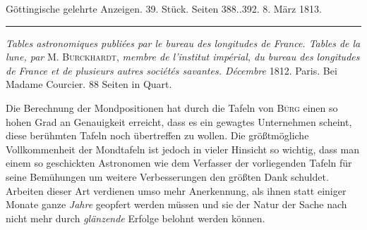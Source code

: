 \clearpage
{}
\begin{center}\small Göttingische gelehrte Anzeigen. 39. Stück. Seiten 388..392. 8. März 1813.\\[3pt]\rule{.72\linewidth}{.3pt}\end{center}

\emph{Tables astronomiques publiées par le bureau des longitudes de France. Tables de la lune, par} M. \textsc{Burckhardt}, \emph{membre de l'institut impérial, du bureau des longitudes de France et de plusieurs autres sociétés savantes. Décembre} 1812. Paris. Bei Madame Courcier. 88 Seiten in Quart.

Die Berechnung der Mondpositionen hat durch die Tafeln von \textsc{Bürg} einen so hohen Grad an Genauigkeit erreicht, dass es ein gewagtes Unternehmen scheint, diese berühmten Tafeln noch übertreffen zu wollen. Die größtmögliche Vollkommenheit der Mondtafeln ist jedoch in vieler Hinsicht so wichtig, dass man einem so geschickten Astronomen wie dem Verfasser der vorliegenden Tafeln für seine Bemühungen um weitere Verbesserungen den größten Dank schuldet. Arbeiten dieser Art verdienen umso mehr Anerkennung, als ihnen statt einiger Monate ganze \emph{Jahre} geopfert werden müssen und sie der Natur der Sache nach nicht mehr durch \emph{glänzende} Erfolge belohnt werden können.

